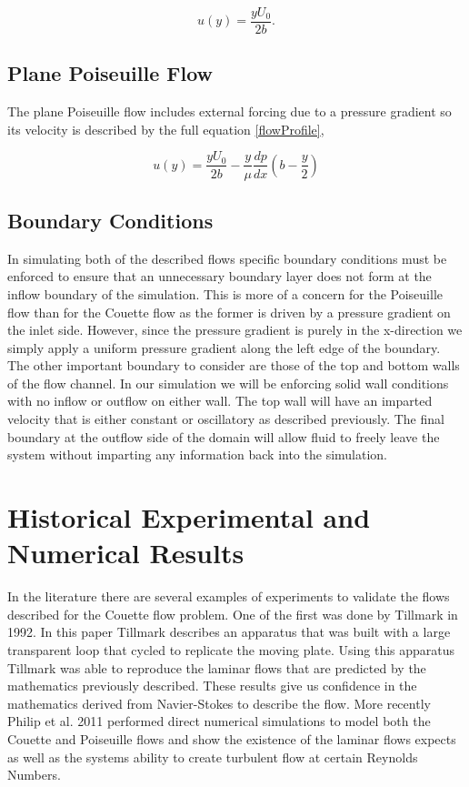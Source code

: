 \documentclass[a4paper,12pt,titlepage]{article}
\begin{document}
\[
u(y) = \frac{yU_0}{2b}.
\]

\subsection{Plane Poiseuille Flow}
The plane Poiseuille flow includes external forcing due to a pressure gradient so its velocity is described by the full equation \ref{flowProfile},

\[
u(y) = \frac{yU_0}{2b} - \frac{y}{\mu} \frac{dp}{dx}\left(b-\frac{y}{2}\right)
\]

\subsection{Boundary Conditions}
In simulating both of the described flows specific boundary conditions must be enforced to ensure that an unnecessary boundary layer does not form at the inflow boundary of the simulation.  This is more of a concern for the Poiseuille flow than for the Couette flow as the former is driven by a pressure gradient on the inlet side.  However, since the pressure gradient is purely in the x-direction we simply apply a uniform pressure gradient along the left edge of the boundary.  The other important boundary to consider are those of the top and bottom walls of the flow channel.  In our simulation we will be enforcing solid wall conditions with no inflow or outflow on either wall.  The top wall will have an imparted velocity that is either constant or oscillatory as described previously.  The final boundary at the outflow side of the domain will allow fluid to freely leave the system without imparting any information back into the simulation.
 
\section{Historical Experimental and Numerical Results}

In the literature there are several examples of experiments to validate the flows described for the Couette flow problem.  One of the first was done by Tillmark \cite{tillmark} in 1992.  In this paper Tillmark describes an apparatus that was built with a large transparent loop that cycled to replicate the moving plate.  Using this apparatus Tillmark was able to reproduce the laminar flows that are predicted by the mathematics previously described.  These results give us confidence in the mathematics derived from Navier-Stokes to describe the flow.  More recently Philip et al. \cite{philip} 2011 performed direct numerical simulations to model both the Couette and Poiseuille flows and show the existence of the laminar flows expects as well as the systems ability to create turbulent flow at certain Reynolds Numbers.  
\end{document}
